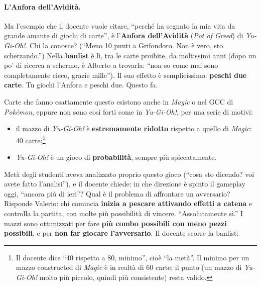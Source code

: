 \paragraph{L'Anfora dell'Avidità.} Ma l'esempio che il docente vuole citare,
``perché ha segnato la mia vita da grande amante di giochi di carte'', è
l'\textbf{Anfora dell'Avidità} (\emph{Pot of Greed}) di \emph{Yu-Gi-Oh!}.
Chi la conosce? (``Meno 10 punti a Grifondoro. Non è vero, sto
scherzando.'') Nella \textbf{banlist} è lì, tra le carte proibite, da
moltissimi anni (dopo un po' di ricerca a schermo, è Alberto a trovarla:
``non so come mai sono completamente cieco, grazie mille''). Il suo effetto è
semplicissimo: \textbf{peschi due carte}. Tu giochi l'Anfora e peschi due.
Questo fa.

Carte che fanno esattamente questo esistono anche in \emph{Magic} o nel GCC
di \emph{Pokémon}, eppure non sono così forti come in \emph{Yu-Gi-Oh!}, per
una serie di motivi:
\begin{itemize}
  \item il mazzo di \emph{Yu-Gi-Oh!} è \textbf{estremamente ridotto}
        rispetto a quello di \emph{Magic}: 40 carte;\footnote{Il docente
        dice ``40 rispetto a 80, minimo'', cioè ``la metà''. Il minimo per un
        mazzo constructed di \emph{Magic} è in realtà di 60 carte; il punto
        (un mazzo di \emph{Yu-Gi-Oh!} molto più piccolo, quindi più
        consistente) resta valido.}
  \item \emph{Yu-Gi-Oh!} è un gioco di \textbf{probabilità}, sempre più
        spiccatamente.
\end{itemize}
Metà degli studenti aveva analizzato proprio questo gioco
(``cosa sto dicendo? voi avete fatto l'analisi''), e il docente chiede: in
che direzione è spinto il gameplay oggi, ``ancora più di ieri''? Qual è il
problema di affrontare un avversario? Risponde Valerio: chi comincia
\textbf{inizia a pescare attivando effetti a catena} e controlla la partita,
con molte più possibilità di vincere. ``Assolutamente sì.'' I mazzi sono
ottimizzati per fare \textbf{più combo possibili con meno pezzi possibili}, e
per \textbf{non far giocare l'avversario}. Il docente scorre la banlist:
